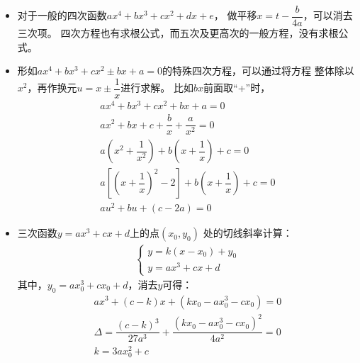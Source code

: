 \begin{itemize}[leftmargin=\inteval{\myitemleftmargin}pt,itemsep=
   \inteval{\myitemitempsep}pt,topsep=\inteval{\myitemtopsep}pt]
\item 对于一般的四次函数$ ax^4+bx^3+cx^2+dx+e $，
做平移$ x=t-\dfrac{b}{4a} $，可以消去三次项。
四次方程也有求根公式，而五次及更高次的一般方程，没有求根公式。

\item 形如$ ax^4+bx^3+cx^2\pm bx+a=0 $的特殊四次方程，可以通过将方程
整体除以$ x^2 $，再作换元$ u=x\pm \dfrac{1}{x} $进行求解。
比如$ bx $前面取“+”时，
\begin{gather*}
    ax^4+bx^3+cx^2+bx+a=0 \\
    ax^2+bx+c+\dfrac{b}{x}+\dfrac{a}{x^2}=0 \\
    a\left(x^2+\dfrac{1}{x^2}\right)+b\left(x+\dfrac{1}{x}\right)+c=0 \\
    a\left[\left(x+\dfrac{1}{x}\right)^2-2\right]+b
    \left(x+\dfrac{1}{x}\right)+c=0 \\
    au^2+bu+(c-2a)=0
\end{gather*}

\item 三次函数$ y =ax^3+cx+d $上的点$ (x_0,y_0) $
处的切线斜率计算：
\begin{align*}
\begin{cases}
    y = k(x-x_0)+y_0  \\
    y = ax^3+cx+d
\end{cases}
\end{align*}
其中，$ y_0=ax_0^3+cx_0+d $，消去$ y $可得：
\begin{gather*}
ax^3+(c-k)x+(kx_0-ax_0^3-cx_0)=0 \\
\Delta=\dfrac{(c-k)^3}{27a^3}+\dfrac{(kx_0-ax_0^3-cx_0)^2}{4a^2}=0 \\
k=3ax_0^2+c
\end{gather*}

\end{itemize}

